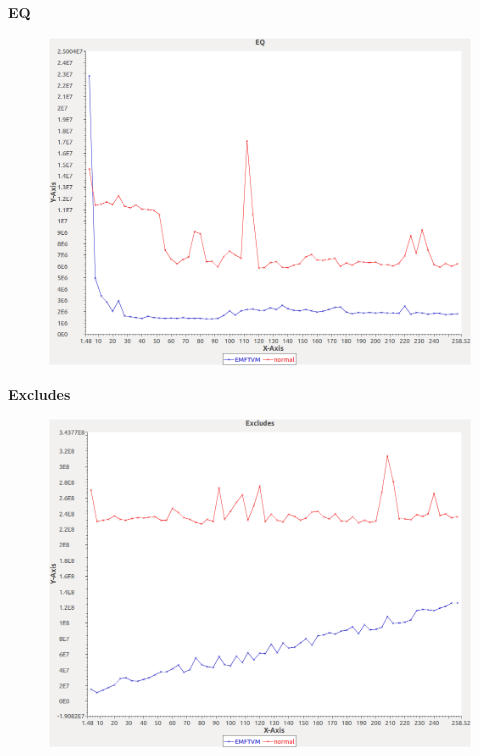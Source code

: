 \noindent\textbf{EQ}

\begin{figure}[h]
\centering
\includegraphics[width=\textwidth]{graphs/bag/EQ}
\end{figure}
\pagebreak

\noindent\textbf{Excludes}

\begin{figure}[h]
\centering
\includegraphics[width=\textwidth]{graphs/bag/Excludes}
\end{figure}
\pagebreak

